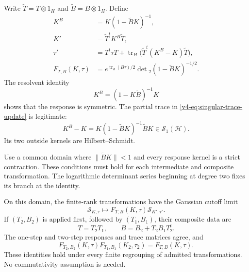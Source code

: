 Write \(\widetilde T=T\otimes1_H\) and
\(\widetilde B=B\otimes1_H\). Define
\begin{align}
 K^B&=K(1-\widetilde BK)^{-1},
                 \label{v4-eq:singular-trace-resolvent}\\
 K'&=\widetilde T^tK^B\widetilde T,
                 \label{v4-eq:singular-trace-response}\\
 \tau'&=T^t\tau T+
       \operatorname{tr}_H\bigl(\widetilde T^t(K^B-K)\widetilde T\bigr),
                 \label{v4-eq:singular-trace-update}\\
 F_{T,B}(K,\tau)&=
       e^{\operatorname{tr}_d(B\tau)/2}
               \det{}_2(1-\widetilde BK)^{-1/2}.
                 \label{v4-eq:singular-trace-scalar}
\end{align}
The resolvent identity
\[
 K^B=(1-K\widetilde B)^{-1}K
\]
shows that the response is symmetric.
The partial trace in
\eqref{v4-eq:singular-trace-update} is legitimate:
\begin{equation}\label{v4-eq:singular-trace-difference}
 K^B-K=K(1-\widetilde BK)^{-1}\widetilde BK
                                      \in\mathcal S_1(\mathcal H).
\end{equation}
Its two outside kernels are Hilbert--Schmidt.

Use a common domain where
\(\|\widetilde BK\|<1\) and every response
kernel is a strict contraction.
These conditions must hold for each
intermediate and composite transformation.
The logarithmic determinant series beginning
at degree two fixes its branch at the identity.

\begin{theorem}\label{v4-thm:singular-trace-transport}
On this domain, the finite-rank transformations
have the Gaussian cutoff limit
\[
       \mathscr S_{K,\tau}
             \longmapsto F_{T,B}(K,\tau)\mathscr S_{K',\tau'}.
\]
If \((T_2,B_2)\) is applied first, followed
by \((T_1,B_1)\), their composite data are
\begin{equation}\label{v4-eq:singular-gaussian-pair-law}
                   T=T_2T_1,\qquad B=B_2+T_2B_1T_2^t.
\end{equation}
The one-step and two-step responses and
trace matrices agree, and
\begin{equation}\label{v4-eq:singular-gaussian-scalar-law}
 F_{T_2,B_2}(K,\tau)
     F_{T_1,B_1}(K_2,\tau_2)=F_{T,B}(K,\tau).
\end{equation}
These identities hold under every finite
regrouping of admitted transformations.
No commutativity assumption is needed.
\end{theorem}

